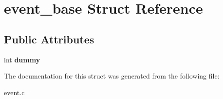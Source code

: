 \hypertarget{structevent__base}{}\section{event\+\_\+base Struct Reference}
\label{structevent__base}
\subsection*{Public Attributes}
\begin{DoxyCompactItemize}
\item 
\hypertarget{structevent__base_a2a9980f06a6926acffcfccb88b5583fd}{}\label{structevent__base_a2a9980f06a6926acffcfccb88b5583fd} 
int {\bfseries dummy}
\end{DoxyCompactItemize}


The documentation for this struct was generated from the following file\+:\begin{DoxyCompactItemize}
\item 
event.\+c\end{DoxyCompactItemize}
